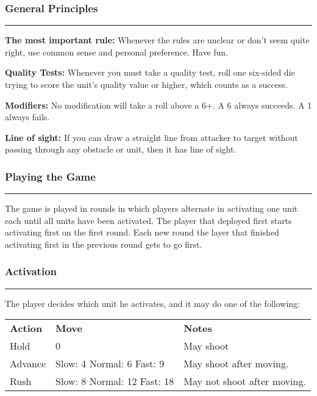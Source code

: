 \documentclass[11pt]{article}
\newcommand{\myheading}[1]{
  \subsubsection*{\centering #1}
  \raggedright
  \hrule
}
\renewenvironment{description}
  {\list{}{\labelwidth=0pt \leftmargin=0pt
   \let\makelabel\descriptionlabel}}
  {\endlist}
\newenvironment{mydescription}{
\begin{description}
  \setlength{\itemsep}{1pt}
  \setlength{\parskip}{0pt}
  \setlength{\parsep}{0pt}}{\end{description}
}
\begin{document}
\begin{multicols*}{3}[]

\raggedcolumns

\myheading{General Principles}

\begin{mydescription}

\item{\bf The most important rule:} Whenever the rules are unclear or
  don’t seem quite right, use common sense and personal
  preference. Have fun.

\item{\bf Quality Tests:} Whenever you must take a quality test, roll
  one six-sided die trying to score the unit’s quality value or
  higher, which counts as a success.

\item{\bf Modifiers:} No modification will take a roll above a 6+. A 6
  always succeeds. A 1 always fails.

\item{\bf Line of sight:} If you can draw a straight line from
  attacker to target without passing through any obstacle or unit,
  then it has line of sight.

\end{mydescription}

\myheading{Playing the Game}

The game is played in rounds in which players alternate in activating
one unit each until all units have been activated. The player that
deployed first starts activating first on the first round. Each new
round the layer that finished activating first in the previous round
gets to go first.

\myheading{Activation}

The player decides which unit he activates, and it may do one of the
following:

\noindent 
{}
\begin{tabular}{lp{2cm}p{2cm}}
\bf{Action} & \bf{Move} & \bf{Notes} \\
Hold & 0 & May shoot \\
Advance & Slow: 4 \newline Normal: 6 \newline Fast: 9 & May shoot
                                                        after moving. \\
Rush & Slow: 8 \newline Normal: 12 \newline Fast: 18 & May not shoot
                                                        after moving. \\
\end{tabular}


\end{multicols*}
\end{document}
